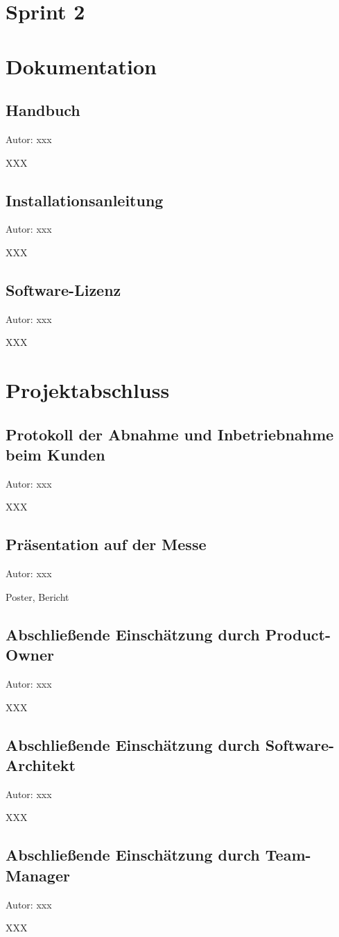 \documentclass[twoside]{report}
\begin{document}
\newpage

\section{Sprint 2}



\newpage



\section{Dokumentation}

\subsection{Handbuch}
{\small Autor: xxx}

XXX

\subsection{Installationsanleitung}
{\small Autor: xxx}

XXX

\subsection{Software-Lizenz}
{\small Autor: xxx}

XXX


\section{Projektabschluss}

\subsection{Protokoll der Abnahme und Inbetriebnahme beim Kunden}
{\small Autor: xxx}

XXX

\subsection{Präsentation auf der Messe}
{\small Autor: xxx}

Poster, Bericht

\subsection{Abschließende Einschätzung durch Product-Owner}
{\small Autor: xxx}

XXX

\subsection{Abschließende Einschätzung durch Software-Architekt}
{\small Autor: xxx}

XXX

\subsection{Abschließende Einschätzung durch Team-Manager}
{\small Autor: xxx}

XXX
\end{document}
